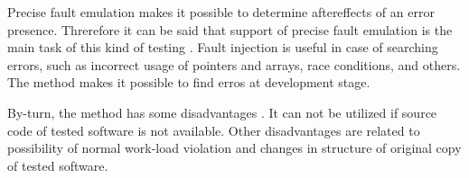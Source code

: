 %
Precise fault emulation makes it possible to determine aftereffects of an error presence. 
%
Threrefore it can be said that support of precise fault emulation is the main task of this kind of testing . 
%
Fault injection is useful in case of searching errors, such as incorrect usage of pointers and arrays, race conditions, and others. 
%
The method makes it possible to find erros at development stage. 

%
By-turn, the method has some disadvantages . 
%
It can not be utilized if source code of tested software is not available. 
%
Other disadvantages are related to possibility of normal work-load violation and changes in structure of original copy of tested software. 